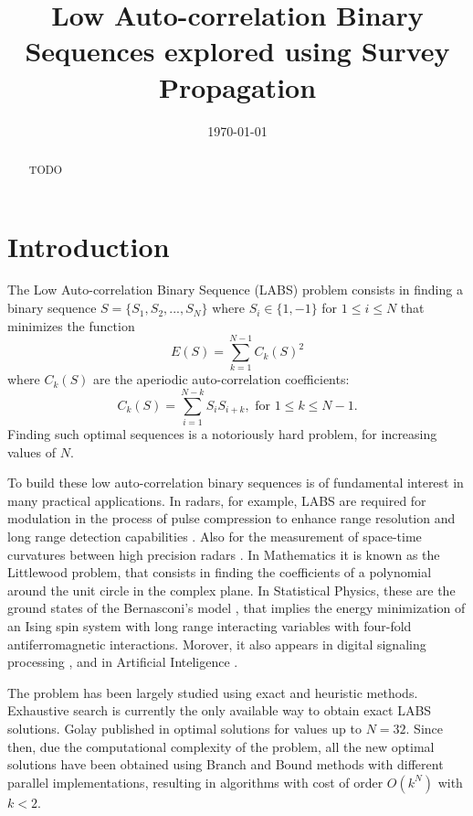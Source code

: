 \documentclass[11pt]{amsart}
\theoremstyle{definition} \newtheorem{defi}{Definition}
\begin{document}
\title{Low Auto-correlation Binary Sequences explored using Survey Propagation}

\date{\today}

\begin{abstract}
  \noindent
TODO

\end{abstract}
\maketitle

\section{Introduction}

The Low Auto-correlation Binary Sequence (LABS) problem consists in finding a binary sequence $ S =\{S_1, S_2,..., S_N\} $ where $ S_i \in \{1,-1\}  $ for $1\leq i \leq N$ that minimizes the function
\begin{equation}
E(S)=\sum_{k=1}^{N-1}C_k(S)^2 \label{eq:energy}
\end{equation}
\noindent where $C_k(S)$ are the aperiodic auto-correlation coefficients:
\begin{equation}
C_k(S)=\sum_{i=1}^{N-k} S_i S_{i+k}, \mbox{ for } 1 \leq k \leq N-1. \label{eq:autocorr}
\end{equation}
\noindent Finding such optimal sequences is a notoriously hard problem, for increasing values of $N$\cite{bovskovic14}.

To build these low auto-correlation binary sequences is of fundamental interest in many practical applications. In radars, for example, LABS are required for modulation in the process of pulse compression to enhance range resolution and long range detection capabilities \cite{SR14}. Also for the measurement of space-time curvatures between high precision radars \cite{Mertens16}.
In Mathematics it is known as the Littlewood problem, that consists in finding the coefficients of a polynomial around the unit circle in the complex plane.
In Statistical Physics, these are the ground states of the Bernasconi's model \cite{Bernasconi87}, that implies the energy minimization of an Ising spin system with long range interacting variables with four-fold antiferromagnetic interactions.
Morover, it also appears in digital signaling processing \cite{Kratica12}, and in Artificial Inteligence \cite{Amaya13}.

The problem has been largely studied using exact and heuristic methods. Exhaustive search is currently the only available way to obtain exact LABS solutions. 
Golay published in \cite{Golay} optimal solutions for values up to $N = 32$. Since then, due the computational complexity of the problem, all the new optimal solutions have been obtained using Branch and Bound \cite{Mertens16} methods with different parallel implementations, resulting in algorithms with cost of order $O(k^N )$ with $k < 2$.
\end{document}
